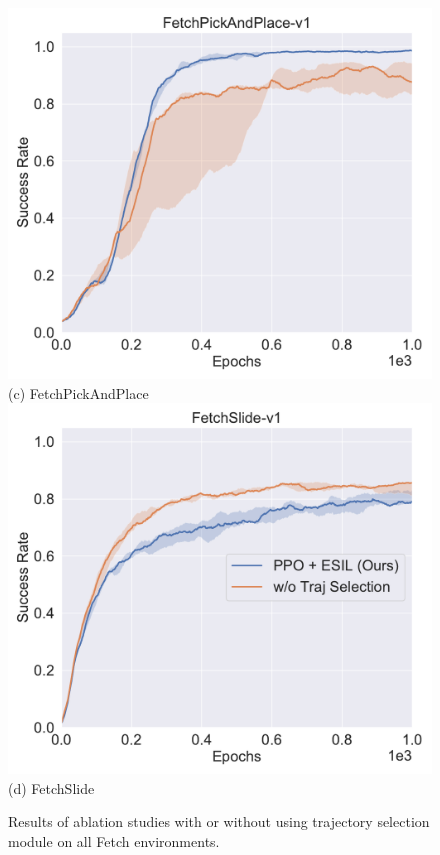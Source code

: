 \begin{figure}[H]
  \includegraphics[width=\linewidth]{figures/chapter3/pick_hs.pdf}
  ({c}) FetchPickAndPlace
\endminipage
{}%
  \centering
  \includegraphics[width=\linewidth]{figures/chapter3/slide_hs.pdf}
  ({d}) FetchSlide
\endminipage\hfill
\caption{Results of ablation studies with or without using trajectory selection module on all Fetch environments.}
\label{fig:hs_compare}
\end{figure}

